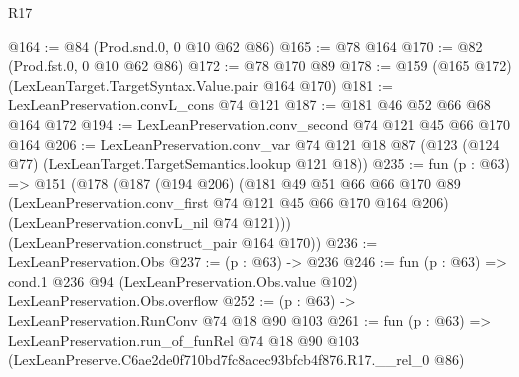 \begin{lexlean}{R17}
\begin{coremodule}
@164 := @84 (Prod.snd.{0, 0} @10 @62 @86)
@165 := @78 @164
@170 := @82 (Prod.fst.{0, 0} @10 @62 @86)
@172 := @78 @170 @89
@178 := @159 (@165 @172) (LexLeanTarget.TargetSyntax.Value.pair @164 @170)
@181 := LexLeanPreservation.convL_cons @74 @121
@187 := @181 @46 @52 @66 @68 @164 @172
@194 := LexLeanPreservation.conv_second @74 @121 @45 @66 @170 @164
@206 := LexLeanPreservation.conv_var
    @74
    @121
    @18
    @87
    (@123 (@124 @77) (LexLeanTarget.TargetSemantics.lookup @121 @18))
@235 := fun (p : @63) =>
  @151
    (@178
      (@187
        (@194 @206)
        (@181
          @49
          @51
          @66
          @66
          @170
          @89
          (LexLeanPreservation.conv_first @74 @121 @45 @66 @170 @164 @206)
          (LexLeanPreservation.convL_nil @74 @121)))
      (LexLeanPreservation.construct_pair @164 @170))
@236 := LexLeanPreservation.Obs
@237 := (p : @63) -> @236
@246 := fun (p : @63) =>
  cond.{1} @236 @94 (LexLeanPreservation.Obs.value @102) LexLeanPreservation.Obs.overflow
@252 := (p : @63) -> LexLeanPreservation.RunConv @74 @18 @90 @103
@261 := fun (p : @63) =>
  LexLeanPreservation.run_of_funRel
    @74
    @18
    @90
    @103
    (LexLeanPreserve.C6ae2de0f710bd7fc8acec93bfcb4f876.R17.__rel_0 @86)
\end{coremodule}
\end{lexlean}
